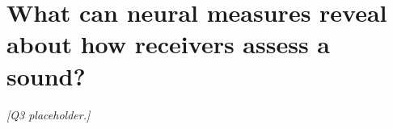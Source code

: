 \section{What can neural measures reveal about how receivers assess a sound?}
\label{sec:q3}


\textit{[Q3 placeholder.]}
